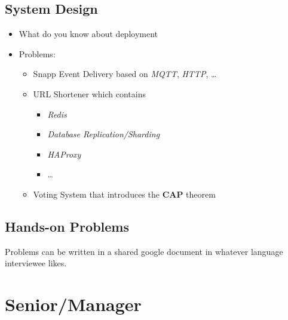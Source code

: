 \documentclass[]{book}
\begin{document}
\section{System Design}

\begin{itemize}
  \item What do you know about deployment
  \item Problems:
    \begin{itemize}
      \item Snapp Event Delivery based on \textit{MQTT}, \textit{HTTP}, \ldots
      \item URL Shortener which contains
        \begin{itemize}
          \item \textit{Redis}
          \item \textit{Database Replication/Sharding}
          \item \textit{HAProxy}
          \item \ldots
        \end{itemize}
      \item Voting System that introduces the \textbf{CAP} theorem
    \end{itemize}
\end{itemize}

\section{Hands-on Problems}

Problems can be written in a shared google document in whatever language interviewee likes.







\chapter{Senior/Manager}
\end{document}
